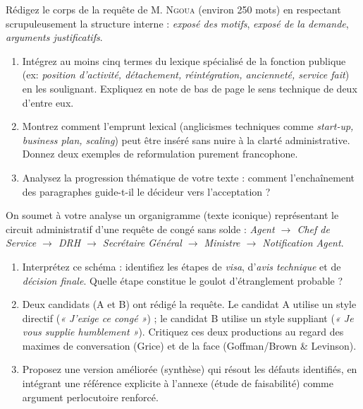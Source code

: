 \documentclass[11pt]{article}
\begin{document}
\begin{exercice}
Rédigez le corps de la requête de M. \textsc{Ngoua} (environ 250 mots) en respectant scrupuleusement la structure interne : \textit{exposé des motifs}, \textit{exposé de la demande}, \textit{arguments justificatifs}.
\begin{enumerate}
    \item Intégrez au moins cinq termes du lexique spécialisé de la fonction publique (ex: \textit{position d'activité, détachement, réintégration, ancienneté, service fait}) en les soulignant. Expliquez en note de bas de page le sens technique de deux d'entre eux.
    \item Montrez comment l'emprunt lexical (anglicismes techniques comme \textit{start-up, business plan, scaling}) peut être inséré sans nuire à la clarté administrative. Donnez deux exemples de reformulation purement francophone.
    \item Analysez la progression thématique de votre texte : comment l'enchaînement des paragraphes guide-t-il le décideur vers l'acceptation ?
\end{enumerate}
\end{exercice}

\begin{exercice}
On soumet à votre analyse un organigramme (texte iconique) représentant le circuit administratif d'une requête de congé sans solde : \textit{Agent $\rightarrow$ Chef de Service $\rightarrow$ DRH $\rightarrow$ Secrétaire Général $\rightarrow$ Ministre $\rightarrow$ Notification Agent}.
\begin{enumerate}
    \item Interprétez ce schéma : identifiez les étapes de \textit{visa}, d'\textit{avis technique} et de \textit{décision finale}. Quelle étape constitue le goulot d'étranglement probable ?
    \item Deux candidats (A et B) ont rédigé la requête. Le candidat A utilise un style directif (\textit{« J'exige ce congé »}) ; le candidat B utilise un style suppliant (\textit{« Je vous supplie humblement »}). Critiquez ces deux productions au regard des maximes de conversation (Grice) et de la face (Goffman/Brown \& Levinson).
    \item Proposez une version améliorée (synthèse) qui résout les défauts identifiés, en intégrant une référence explicite à l'annexe (étude de faisabilité) comme argument perlocutoire renforcé.
\end{enumerate}
\end{exercice}
\end{document}
